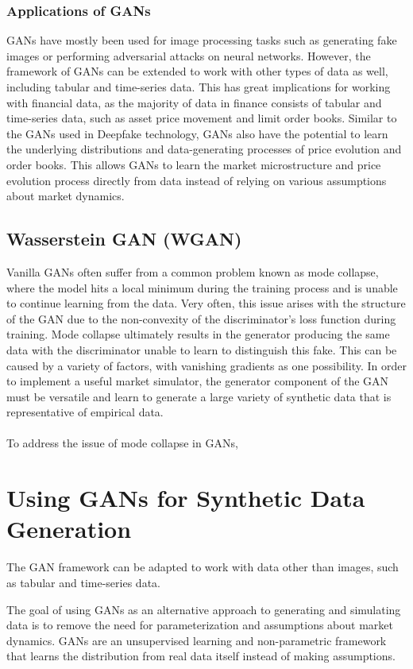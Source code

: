 \subsubsection{Applications of GANs}
GANs have mostly been used for image processing tasks such as generating fake images or performing adversarial attacks on neural networks. However, the framework of GANs can be extended to work with other types of data as well, including tabular and time-series data. This has great implications for working with financial data, as the majority of data in finance consists of tabular and time-series data, such as asset price movement and limit order books. Similar to the GANs used in Deepfake technology, GANs also have the potential to learn the underlying distributions and data-generating processes of price evolution and order books. This allows GANs to learn the market microstructure and price evolution process directly from data instead of relying on various assumptions about market dynamics.

\subsection{Wasserstein GAN (WGAN)}
Vanilla GANs often suffer from a common problem known as mode collapse, where the model hits a local minimum during the training process and is unable to continue learning from the data. Very often, this issue arises with the structure of the GAN due to the non-convexity of the discriminator's loss function during training. Mode collapse ultimately results in the generator producing the same data with the discriminator unable to learn to distinguish this fake. This can be caused by a variety of factors, with vanishing gradients as one possibility. In order to implement a useful market simulator, the generator component of the GAN must be versatile and learn to generate a large variety of synthetic data that is representative of empirical data.
\\
\\
To address the issue of mode collapse in GANs, 
\section{Using GANs for Synthetic Data Generation}
The GAN framework can be adapted to work with data other than images, such as tabular and time-series data. 

The goal of using GANs as an alternative approach to generating and simulating data is to remove the need for parameterization and assumptions about market dynamics. GANs are an unsupervised learning and non-parametric framework that learns the distribution from real data itself instead of making assumptions.

